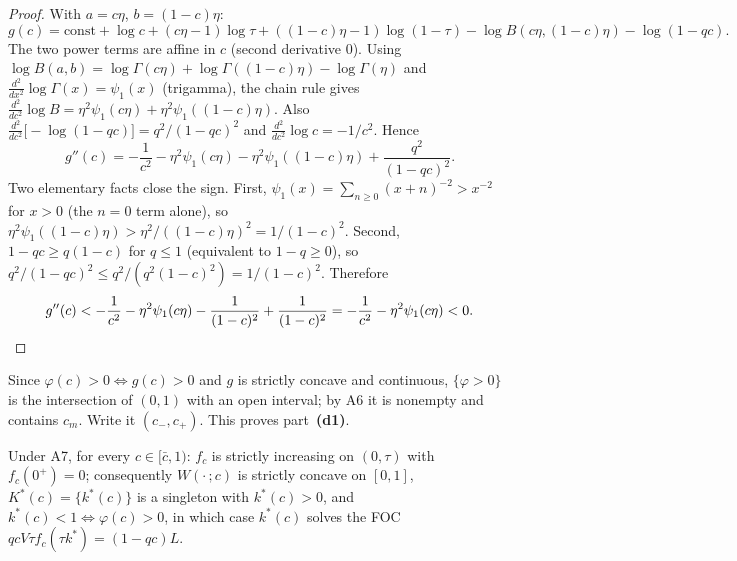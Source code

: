 \begin{proof}
With $a = c\eta$, $b = (1 - c)\eta$:
\[
g(c) = \mathrm{const} + \log c + (c\eta - 1)\log\tau + ((1 - c)\eta - 1)\log(1 - \tau)
- \log B(c\eta, (1 - c)\eta) - \log(1 - qc).
\]
The two power terms are affine in $c$ (second derivative $0$). Using
$\log B(a, b) = \log\Gamma(c\eta) + \log\Gamma((1 - c)\eta) - \log\Gamma(\eta)$ and
$\frac{d^2}{dx^2}\log\Gamma(x) = \psi_1(x)$ (trigamma), the chain rule gives
$\frac{d^2}{dc^2}\log B = \eta^2\psi_1(c\eta) + \eta^2\psi_1((1 - c)\eta)$. Also
$\frac{d^2}{dc^2}\bigl[-\log(1 - qc)\bigr] = q^2/(1 - qc)^2$ and
$\frac{d^2}{dc^2}\log c = -1/c^2$. Hence
\[
g''(c) = -\frac{1}{c^2} - \eta^2\psi_1(c\eta) - \eta^2\psi_1((1 - c)\eta)
+ \frac{q^2}{(1 - qc)^2}.
\]
Two elementary facts close the sign. First,
$\psi_1(x) = \sum_{n \ge 0} (x + n)^{-2} > x^{-2}$ for $x > 0$ (the $n = 0$ term
alone), so $\eta^2\psi_1((1 - c)\eta) > \eta^2/((1 - c)\eta)^2 = 1/(1 - c)^2$. Second,
$1 - qc \ge q(1 - c)$ for $q \le 1$ (equivalent to $1 - q \ge 0$), so
$q^2/(1 - qc)^2 \le q^2/(q^2(1 - c)^2) = 1/(1 - c)^2$. Therefore
\[
g''(c) < -\frac{1}{c^2} - \eta^2\psi_1(c\eta) - \frac{1}{(1 - c)^2}
+ \frac{1}{(1 - c)^2} = -\frac{1}{c^2} - \eta^2\psi_1(c\eta) < 0.
\qedhere
\]
\end{proof}

\noindent Since $\varphi(c) > 0 \iff g(c) > 0$ and $g$ is strictly concave and
continuous, $\{\varphi > 0\}$ is the intersection of $(0,1)$ with an open interval; by
A6 it is nonempty and contains $c_m$. Write it $(c_-, c_+)$. This proves
part~\textbf{(d1)}.

\begin{lemma}
\label{lem:concave}
Under A7, for every $c \in [\bar c, 1)$: $f_c$ is strictly increasing on $(0, \tau)$
with $f_c(0^+) = 0$; consequently $W(\cdot\,; c)$ is strictly concave on $[0,1]$,
$K^*(c) = \{k^*(c)\}$ is a singleton with $k^*(c) > 0$, and
$k^*(c) < 1 \iff \varphi(c) > 0$, in which case $k^*(c)$ solves the FOC
$qcV\tau f_c(\tau k^*) = (1 - qc)L$.
\end{lemma}

